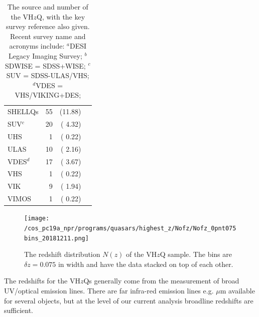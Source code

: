 \documentclass[usenatbib]{mnras}
\begin{document}
\begin{table}
\begin{tabular}{l r r l}
  SHELLQs         &    55    &   (11.88)  &  \citet{Matsuoka2016}     \\  
  SUV$^{c}$       &   20     &    ( 4.32)  & \citet{YangJ2017} \\
  UHS               &    1      &  ( 0.22)     &  \citet{WangF2017} \\
  ULAS               &   10   &   ( 2.16)     & \citet{Lawrence2007} \\
  VDES$^{d}$       &   17  &    ( 3.67)     &  \citet{Reed2017} \\
  VHS                 &     1  &     ( 0.22)    & \citet{WangF2018b} \\
  VIK                 &     9    &  ( 1.94)    &  \citet{Edge2013} \\
  VIMOS           &    1      &  ( 0.22)     &   \citet{LeFevre2003} \\
\hline  \hline
\end{tabular}
\caption{The source and number of the VH$z$Q, with the key survey reference also given. 
  Recent survey name and acronyms include: 
  $^{a}$DESI Legacy Imaging Survey; 
  $^{b}$SDWISE = SDSS+WISE; 
  $^{c}$SUV  = SDSS-ULAS/VHS; 
  $^{d}$VDES = VHS/VIKING+DES; 
}
      \label{tab:surveys}
\end{table}

\begin{figure}
  \texttt{[image: /cos\_pc19a\_npr/programs/quasars/highest\_z/Nofz/Nofz\_0pnt075bins\_20181211.png]}
  \centering
  \vspace{-12pt}
  \caption[]
  {The redshift distribution $N(z)$ of the VH$z$Q sample. 
    The bins are $\delta z=0.075$ in width and have the data 
    stacked on top of each other.}
  \label{fig:Nofz}
\end{figure}

The redshifts for the VH$z$Qs generally come from the measurement of
broad UV/optical emission lines. There are far infra-red emission
lines e.g.  $\mu$m available for several objects, but at the
level of our current analysis broadline redshifts are sufficient.
\end{document}
